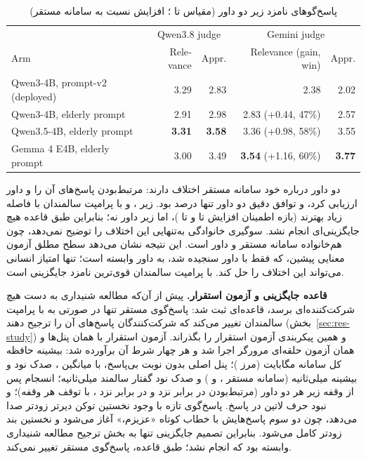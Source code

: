 \begin{table}[ht]
\centering
\caption{پاسخ‌گوهای نامزد زیر دو داور (مقیاس  تا ؛ افزایش نسبت به سامانه مستقر)}
\label{tab:resp-v2}
\small
\begin{latin}
\begin{tabular}{lrrrr}
\toprule
 & \multicolumn{2}{c}{Qwen3.8 judge} & \multicolumn{2}{c}{Gemini judge} \\
Arm & Relevance & Appr. & Relevance (gain, win) & Appr. \\
\midrule
Qwen3-4B, prompt-v2 (deployed) & 3.29 & 2.83 & 2.38 & 2.02 \\
Qwen3-4B, elderly prompt & 2.91 & 2.98 & 2.83 (+0.44, 47\%) & 2.57 \\
Qwen3.5-4B, elderly prompt & \textbf{3.31} & \textbf{3.58} & 3.36 (+0.98, 58\%) & 3.55 \\
Gemma 4 E4B, elderly prompt & 3.00 & 3.49 & \textbf{3.54} (+1.16, 60\%) & \textbf{3.77} \\
\bottomrule
\end{tabular}
\end{latin}
\end{table}

دو داور درباره خود سامانه مستقر اختلاف دارند:  مرتبط‌بودن پاسخ‌های آن
را  و داور   ارزیابی کرد، و توافق دقیق دو داور تنها
 درصد بود. زیر ،  و  با پرامپت
سالمندان با فاصله زیاد بهترند (بازه اطمینان افزایش  تا  و
 تا )، اما زیر داور  نه؛ بنابراین طبق قاعده هیچ
جایگزینی‌ای انجام نشد. سوگیری خانوادگی به‌تنهایی این اختلاف را توضیح نمی‌دهد،
چون  هم‌خانواده سامانه مستقر و داور  است. این نتیجه
نشان می‌دهد سطح مطلق آزمون معنایی پیشین، که فقط با داور  سنجیده شد، به
داور وابسته است؛ تنها امتیاز انسانی می‌تواند این اختلاف را حل کند.
 با پرامپت سالمندان قوی‌ترین نامزد جایگزینی است.

\textbf{قاعده جایگزینی و آزمون استقرار.} پیش از آن‌که مطالعه شنیداری به دست هیچ
شرکت‌کننده‌ای برسد، قاعده‌ای ثبت شد: پاسخ‌گوی مستقر تنها در صورتی به  با پرامپت سالمندان تغییر
می‌کند که شرکت‌کنندگان پاسخ‌های آن را ترجیح دهند (بخش~\ref{sec:res-study}) و همین
پیکربندی آزمون استقرار را بگذراند. آزمون استقرار با همان پنل‌ها و همان آزمون
حلقه‌ای مرورگر اجرا شد و هر چهار شرط آن برآورده شد: بیشینه حافظه کل سامانه
 مگابایت (مرز )؛ پنل اصلی بدون نوبت بی‌پاسخ، با میانگین
، صدک نود  و بیشینه  میلی‌ثانیه (سامانه مستقر ،
 و ) و صدک نود گفتار سالمند  میلی‌ثانیه؛ انسجام پس از وقفه
زیر هر دو داور (مرتبط‌بودن  در برابر  نزد  و 
در برابر  نزد ، با توقف هر  وقفه)؛ و نبود حرف لاتین در
 پاسخ. پاسخ‌گوی تازه با وجود نخستین توکن دیرتر زودتر صدا می‌دهد، چون دو
سوم پاسخ‌هایش با خطاب کوتاه «عزیزم،» آغاز می‌شود و نخستین بند زودتر کامل
می‌شود. بنابراین تصمیم جایگزینی تنها به بخش ترجیح مطالعه شنیداری وابسته بود که انجام
نشد؛ طبق قاعده، پاسخ‌گوی مستقر تغییر نمی‌کند.

